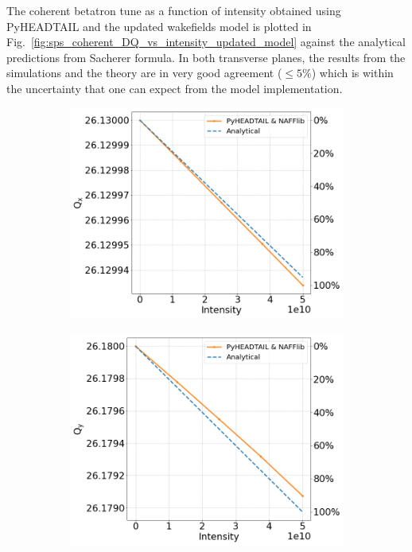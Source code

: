  The coherent betatron tune as a function of intensity obtained using PyHEADTAIL and the updated wakefields model is plotted in Fig.~\ref{fig:sps_coherent_DQ_vs_intensity_updated_model} against the analytical predictions from Sacherer formula. In both transverse planes, the results from the simulations and the theory are in very good agreement ($\leq 5\%$) which is within the uncertainty that one can expect from the model implementation. 

\begin{figure}[!ht]
    \centering
    \begin{subfigure}[t]{0.45\textwidth}
        \centering
        \includegraphics[width=1\textwidth]{images/Ch7/Qx_vs_intensity_complete_impedance_sps_q26model_updated_MD2018_parameters_integer.png}
    \end{subfigure}
    \hfill
    \begin{subfigure}[t]{0.45\textwidth}
        \centering
        \includegraphics[width=1\textwidth]{images/Ch7/Qy_vs_intensity_complete_impedance_sps_q26model_updated_MD2018_parameters_integer.png}

\end{subfigure}
\end{figure}
